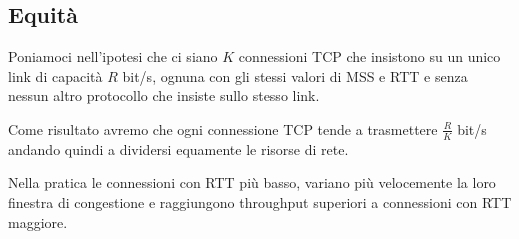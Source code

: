 \subsection{Equità}
Poniamoci nell'ipotesi che ci siano $K$ connessioni TCP che insistono su un unico link di capacità
$R$ bit/s, ognuna con gli stessi valori di MSS e RTT e senza nessun altro protocollo che insiste
sullo stesso link.

Come risultato avremo che ogni connessione TCP tende a trasmettere $\frac{R}{K}$ bit/s andando
quindi a dividersi equamente le risorse di rete.

Nella pratica le connessioni con RTT più basso, variano più velocemente la loro finestra di
congestione e raggiungono throughput superiori a connessioni con RTT maggiore.
